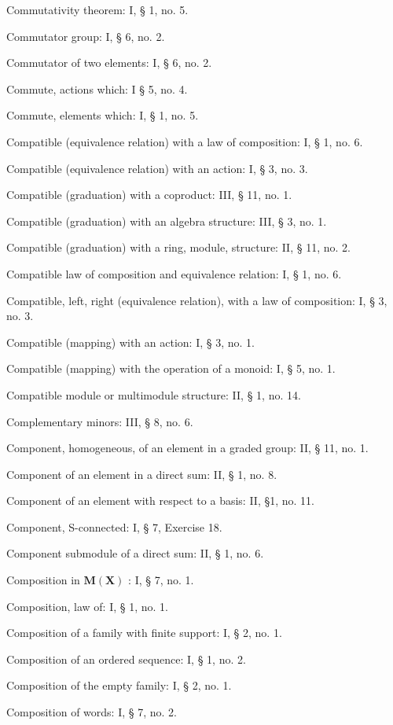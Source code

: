 Commutativity theorem: I, § 1, no. 5.

Commutator group: I, § 6, no. 2.

Commutator of two elements: I, § 6, no. 2.

Commute, actions which: I § 5, no. 4.

Commute, elements which: I, § 1, no. 5.

Compatible (equivalence relation) with a law of composition: I, § 1, no. 6.

Compatible (equivalence relation) with an action: I, § 3, no. 3.

Compatible (graduation) with a coproduct: III, § 11, no. 1.

Compatible (graduation) with an algebra structure: III, § 3, no. 1.

Compatible (graduation) with a ring, module, structure: II, § 11, no. 2.

Compatible law of composition and equivalence relation: I, § 1, no. 6.

Compatible, left, right (equivalence relation), with a law of composition: I, § 3, no. 3.

Compatible (mapping) with an action: I, § 3, no. 1.

Compatible (mapping) with the operation of a monoid: I, § 5, no. 1.

Compatible module or multimodule structure: II, § 1, no. 14.

Complementary minors: III, § 8, no. 6.

Component, homogeneous, of an element in a graded group: II, § 11, no. 1.

Component of an element in a direct sum: II, § 1, no. 8.

Component of an element with respect to a basis: II, §1, no. 11.

Component, S-connected: I, § 7, Exercise 18.

Component submodule of a direct sum: II, § 1, no. 6.

Composition in \(\mathbf{M}(\mathbf{X})\) : I, § 7, no. 1.

Composition, law of: I, § 1, no. 1.

Composition of a family with finite support: I, § 2, no. 1.

Composition of an ordered sequence: I, § 1, no. 2.

Composition of the empty family: I, § 2, no. 1.

Composition of words: I, § 7, no. 2.

